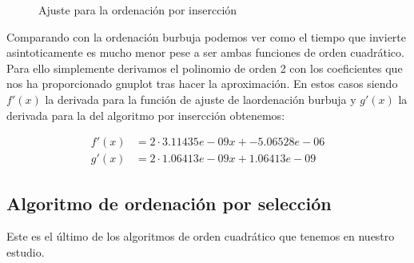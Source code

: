 \documentclass{article}
\begin{document}
\begin{figure}[H]%
    \centering
    \caption{Ajuste para la ordenación por insercción}%
    \label{fig:example}%
\end{figure}

Comparando con la ordenación burbuja podemos ver como el tiempo que
invierte asintoticamente es mucho menor pese a ser ambas funciones de
orden cuadrático. Para ello simplemente derivamos el polinomio de
orden 2 con los coeficientes que nos ha proporcionado gnuplot tras
hacer la aproximación. En estos casos siendo $f'(x)$ la derivada para
la función de ajuste de laordenación burbuja y $g'(x)$ la derivada
para la del algoritmo por insercción obtenemos:

\begin{align}
  f'(x) & = 2\cdot 3.11435e-09x + -5.06528e-06 \\
  g'(x) & = 2\cdot1.06413e-09x + 1.06413e-09
\end{align}

\subsection{Algoritmo de ordenación por selección}

Este es el último de los algoritmos de orden cuadrático que tenemos en nuestro estudio.
  
\end{document}
